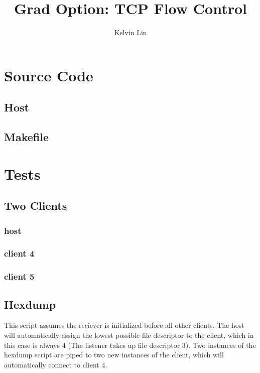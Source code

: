 \documentclass[12pt]{article}
\title{Grad Option: TCP Flow Control}
\author{Kelvin Lin}
\begin{document}
\maketitle

\section{Source Code}

\subsection{Host}


\subsection{Makefile}


\section{Tests}

\subsection{Two Clients}

\subsubsection{host}


\subsubsection{client 4}


\subsubsection{client 5}


\subsection{Hexdump}
This script assumes the reciever is initialized before all other clients.
The host will automatically assign the lowest possible file descriptor to the client, which in this case is always 4
(The listener takes up file descriptor 3).
Two instances of the hexdump script are piped to two new instances of the client, which will automatically connect to client 4.
\end{document}
